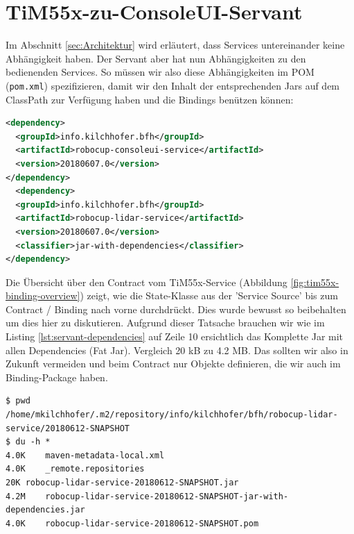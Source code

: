 \section{TiM55x-zu-ConsoleUI-Servant}
Im Abschnitt \ref{sec:Architektur} wird erläutert, dass Services untereinander keine Abhängigkeit haben. Der Servant aber hat nun Abhängigkeiten zu den bedienenden Services. So müssen wir also diese Abhängigkeiten im POM (\texttt{pom.xml}) spezifizieren, damit wir den Inhalt der entsprechenden Jars auf dem ClassPath zur Verfügung haben und die Bindings benützen können:
\begin{lstlisting}[caption={Dependencies vom TiM55x-zu-UI-Servant},label={lst:servant-dependencies},language={XML}]
<dependency>
  <groupId>info.kilchhofer.bfh</groupId>
  <artifactId>robocup-consoleui-service</artifactId>
  <version>20180607.0</version>
</dependency>
  <dependency>
  <groupId>info.kilchhofer.bfh</groupId>
  <artifactId>robocup-lidar-service</artifactId>
  <version>20180607.0</version>
  <classifier>jar-with-dependencies</classifier>
</dependency>
\end{lstlisting}
\label{sec:servant-dependencies}
Die Übersicht über den Contract vom TiM55x-Service (Abbildung \ref{fig:tim55x-binding-overview}) zeigt, wie die State-Klasse aus der 'Service Source' bis zum Contract / Binding nach vorne durchdrückt. Dies wurde bewusst so beibehalten um dies hier zu diskutieren. Aufgrund dieser Tatsache brauchen wir wie im Listing \ref{lst:servant-dependencies} auf Zeile 10 ersichtlich das Komplette Jar mit allen Dependencies (Fat Jar). Vergleich 20 kB zu 4.2 MB. Das sollten wir also in Zukunft vermeiden und beim Contract nur Objekte definieren, die wir auch im Binding-Package haben.
\begin{lstlisting}[caption={Grössenvergleich Jar zu Fat-Jar vom TiM55x-Service},label={lst:tim55x-service-fat-jar},language={none}]
$ pwd
/home/mkilchhofer/.m2/repository/info/kilchhofer/bfh/robocup-lidar-service/20180612-SNAPSHOT
$ du -h *
4.0K	maven-metadata-local.xml
4.0K	_remote.repositories
20K	robocup-lidar-service-20180612-SNAPSHOT.jar
4.2M	robocup-lidar-service-20180612-SNAPSHOT-jar-with-dependencies.jar
4.0K	robocup-lidar-service-20180612-SNAPSHOT.pom
\end{lstlisting}

